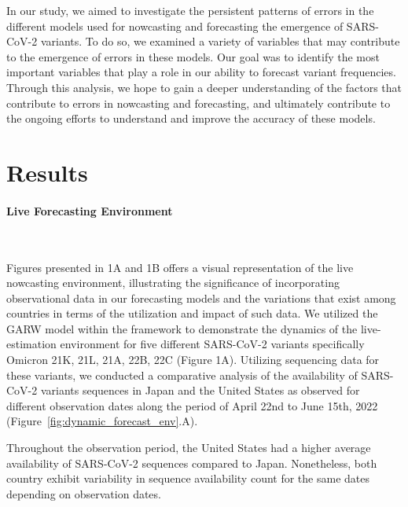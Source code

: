 \documentclass[11pt,oneside,letterpaper]{article}
\begin{document}
In our study, we aimed to investigate the persistent patterns of errors in the different models used for nowcasting and forecasting the emergence of SARS-CoV-2 variants. 
To do so, we examined a variety of variables that may contribute to the emergence of errors in these models. 
Our goal was to identify the most important variables that play a role in our ability to forecast variant frequencies.
Through this analysis, we hope to gain a deeper understanding of the factors that contribute to errors in nowcasting and forecasting, and ultimately contribute to the ongoing efforts to understand and improve the accuracy of these models.



\section*{Results} 


\paragraph{Live Forecasting Environment}\

Figures presented in 1A and 1B offers a visual representation of the live nowcasting environment, illustrating the significance of incorporating observational data in our forecasting models and the variations that exist among countries in terms of the utilization and impact of such data.
We utilized the GARW model within the framework to demonstrate the dynamics of the live-estimation environment for five different SARS-CoV-2 variants specifically Omicron 21K, 21L, 21A, 22B, 22C (Figure 1A).
Utilizing sequencing data for these variants, we conducted a comparative analysis of the availability of SARS-CoV-2 variants sequences in Japan and the United States as observed for different observation dates along the period of April 22nd to June 15th, 2022 (Figure~\ref{fig:dynamic_forecast_env}.A).

Throughout the observation period, the United States had a higher average availability of SARS-CoV-2 sequences compared to Japan. 
Nonetheless, both country exhibit variability in sequence availability count for the same dates depending on observation dates. 
\end{document}
